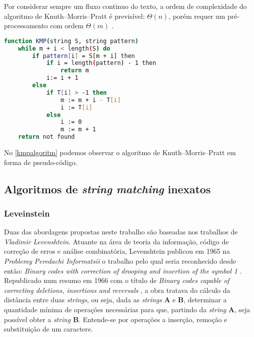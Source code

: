 Por considerar sempre um fluxo continuo do texto, a ordem de complexidade do algoritmo de Knuth–Morris–Pratt é previsível: $\Theta(n)$, porém requer um pré-processamento com ordem $\Theta(m)$ \cite{hume1991fast}.

\begin{lstlisting}[language=Bash,label=kmpalgoritm,caption={Knuth–Morris–Pratt (KMP)}]
function KMP(string S, string pattern)
	while m + i < length(S) do
	    if pattern[i] = S[m + i] then
	        if i = length(pattern) - 1 then
	            return m
	        i:= i + 1
	    else
	        if T[i] > -1 then
	            m := m + i - T[i]
	            i := T[i]
	        else
	            i := 0
	            m := m + 1
	return not found
\end{lstlisting}

No \autoref{kmpalgoritm} podemos observar o algoritmo de Knuth–Morris–Pratt em forma de pseudo-código.


\subsection{Algoritmos de \textit{string matching} inexatos} %

\subsubsection*{Leveinstein} %
\label{sec:leveinstein}

Duas das abordagens propostas neste trabalho são baseadas nos trabalhos de \textit{Vladimir Levenshtein}. Atuante na área de teoria da informação, código de correção de erros e análise combinatória, Levenshtein publicou em 1965 na \textit{Problemy Peredachi Informatsii} o trabalho pelo qual seria reconhecido desde então: \textit{Binary codes with correction of drooping and insertion of the symbol 1} \cite{levenshtein1965}. Republicado num resumo em 1966 com o título de \textit{Binary codes capable of correcting deletions, insertions and reversals} \cite{levenshtein1966}, a obra tratava do cálculo da distância entre duas \textit{strings}, ou seja, dada as \textit{strings} \textbf{A} e \textbf{B}, determinar a quantidade mínima de operações necessárias para que, partindo da \textit{string} \textbf{A}, seja possível obter a \textit{string} \textbf{B}. Entende-se por operações a inserção, remoção e substituição de um caractere.

